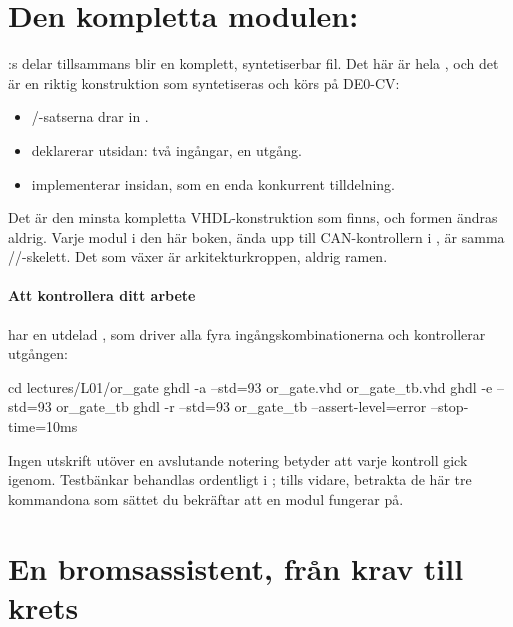 \section{Den kompletta modulen: }
\label{c1:sec:module}

:s delar tillsammans blir en komplett, syntetiserbar fil. Det här är hela
, och det är en riktig konstruktion som syntetiseras och körs på DE0-CV:


\begin{itemize}
  \item {}/-satserna drar in .
  \item {} deklarerar utsidan: två ingångar, en utgång.
  \item {} implementerar insidan, som en enda konkurrent tilldelning.
\end{itemize}

Det är den minsta kompletta VHDL-konstruktion som finns, och formen ändras aldrig. Varje modul i
den här boken, ända upp till CAN-kontrollern i , är samma
//-skelett. Det som växer är arkitekturkroppen,
aldrig ramen.

\paragraph{Att kontrollera ditt arbete}
 har en utdelad , som driver alla fyra ingångskombinationerna
och kontrollerar utgången:

\begin{shell}
cd lectures/L01/or_gate
ghdl -a --std=93 or_gate.vhd or_gate_tb.vhd
ghdl -e --std=93 or_gate_tb
ghdl -r --std=93 or_gate_tb --assert-level=error --stop-time=10ms
\end{shell}

Ingen utskrift utöver en avslutande notering betyder att varje kontroll gick igenom. Testbänkar
behandlas ordentligt i ; tills vidare, betrakta de här tre kommandona
som sättet du bekräftar att en modul fungerar på.

\section{En bromsassistent, från krav till krets}
\label{c1:sec:adas}

